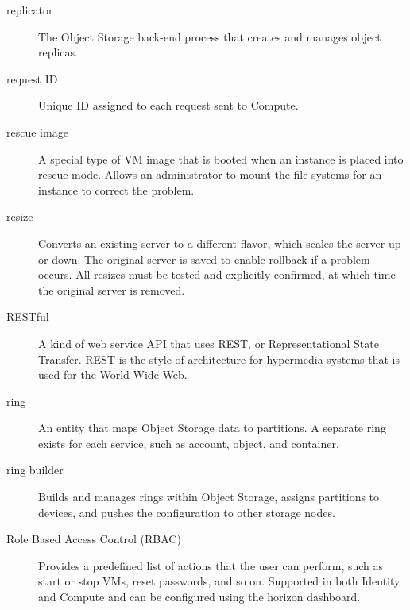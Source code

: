 \documentclass[letterpaper,10pt,english]{sphinxmanual}
\begin{document}
\begin{description}
\item[{replicator}] \leavevmode{}\label{_source/glossary:term-replicator}
The Object Storage back-end process that creates and manages
object replicas.

\item[{request ID}] \leavevmode{}\label{_source/glossary:term-request-id}
Unique ID assigned to each request sent to Compute.

\item[{rescue image}] \leavevmode{}\label{_source/glossary:term-rescue-image}
A special type of VM image that is booted when an instance is
placed into rescue mode. Allows an administrator to mount the file
systems for an instance to correct the problem.

\item[{resize}] \leavevmode{}\label{_source/glossary:term-resize}
Converts an existing server to a different flavor, which scales
the server up or down. The original server is saved to enable rollback
if a problem occurs. All resizes must be tested and explicitly
confirmed, at which time the original server is removed.

\item[{RESTful}] \leavevmode{}\label{_source/glossary:term-restful}
A kind of web service API that uses REST, or Representational
State Transfer. REST is the style of architecture for hypermedia
systems that is used for the World Wide Web.

\item[{ring}] \leavevmode{}\label{_source/glossary:term-ring}
An entity that maps Object Storage data to partitions. A
separate ring exists for each service, such as account, object, and
container.

\item[{ring builder}] \leavevmode{}\label{_source/glossary:term-ring-builder}
Builds and manages rings within Object Storage, assigns
partitions to devices, and pushes the configuration to other storage
nodes.

\item[{Role Based Access Control (RBAC)}] \leavevmode{}\label{_source/glossary:term-role-based-access-control-rbac}
Provides a predefined list of actions that the user can perform,
such as start or stop VMs, reset passwords, and so on. Supported in
both Identity and Compute and can be configured using the
horizon dashboard.


\end{description}
\end{document}
